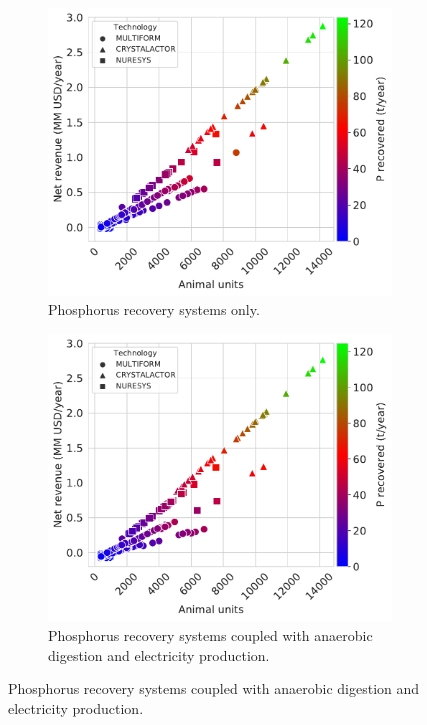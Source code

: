 \begin{refsection}[referencesCh4]
\begin{figure}[h]
	\begin{subfigure}[t]{0.48\linewidth}
		\includegraphics[width=\linewidth]{gfx/Chapter4/NetRev_TechSelected_Pcredits22_REC0.pdf} 
		\caption{Phosphorus recovery systems only.}
		\label{fig:NetRev_TechSelected_Pcredits22_REC0}
	\end{subfigure}
	\quad
	\begin{subfigure}[t]{0.48\linewidth}
		\includegraphics[width=\linewidth]{gfx/Chapter4/NetRev_TechSelected_Pcredits22_REC60.pdf}
		\caption{Phosphorus recovery systems coupled with anaerobic digestion and electricity production.}
		\label{fig:NetRev_TechSelected_Pcredits22_REC60}
	\end{subfigure}
	

\end{figure}
\end{refsection}
